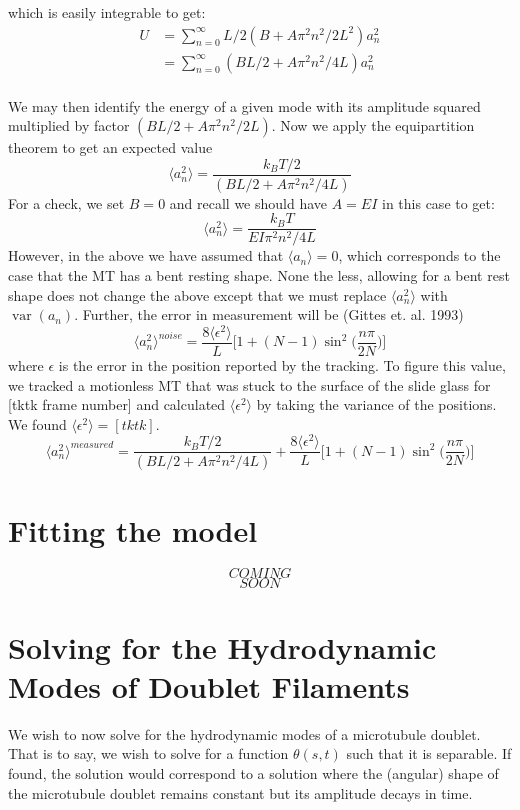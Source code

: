 \documentclass{article}
\DeclareMathOperator{\var}{var}
\theoremstyle{exampstyle} \newtheorem*{remark}{Remark}
\newcommand{\1}{\mathds{1}}
\begin{document}
which is easily integrable to get:
\begin{align*}
    U &= \sum_{n=0}^\infty L/2 (B+A\pi^2 n^2/2L^2)a_n^2  \\
    &=\sum_{n=0}^\infty (BL/2+A\pi^2 n^2 /4L)a_n^2 \\
\end{align*}

We may then identify the energy of a given mode with its amplitude squared multiplied by factor $ (BL/2+A\pi^2 n^2 /2L) $. Now we apply the equipartition theorem to get an expected value 
$$ \langle a_n^2 \rangle = \frac{k_BT/2}{(BL/2+A\pi^2 n^2 /4L)} $$
For a check, we set $B=0$ and recall we should have $A = EI$ in this case to get:
$$ \langle a_n^2 \rangle = \frac{k_BT}{EI \pi^2 n^2 /4L} $$
However, in the above we have assumed that $\langle a_n \rangle =0 $, which corresponds to the case that the MT has a bent resting shape. None the less, allowing for a bent rest shape does not change the above except that we must replace $\langle a_n^2 \rangle$ with $\var(a_n)$.
Further, the error in measurement will be (Gittes et. al. 1993)
$$ \langle a_n^2 \rangle^{noise} = \frac{8\langle \epsilon^2 \rangle}{L}\Big [1+(N-1)\sin^2 \Big (\frac{n\pi}{2N}\Big )\Big ] $$ 
where $\epsilon$ is the error in the position reported by the tracking. To figure this value, we tracked a motionless MT that was stuck to the surface of the slide glass for [tktk frame number] and calculated  $\langle \epsilon^2 \rangle$ by taking the variance of the positions. We found $\langle \epsilon^2 \rangle = [tktk]$.
$$ \langle a_n^2 \rangle^{measured}=\frac{k_BT/2}{(BL/2+A\pi^2 n^2 /4L)} + \frac{8\langle \epsilon^2 \rangle}{L}\Big [1+(N-1)\sin^2 \Big (\frac{n\pi}{2N}\Big )\Big ] $$ 

\section{Fitting the model}

$$ COMING $$
$$ SOON $$

\section{Solving for the Hydrodynamic Modes of Doublet Filaments}

We wish to now solve for the hydrodynamic modes of a microtubule doublet. That is to say, we wish to solve for a function $\theta(s,t)$ such that it is separable. If found, the solution would correspond to a solution where the (angular) shape of the microtubule doublet remains constant but its amplitude decays in time.
\end{document}
